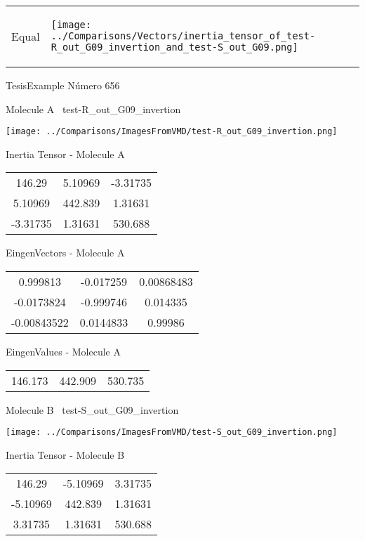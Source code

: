 \vtab[-5mm]
\begin{tabular}{*{2}{m{}}}
\begin{center}
\textcolor{NavyBlue}{\Large Equal}
\end{center}
&
\begin{center}
\texttt{[image: ../Comparisons/Vectors/inertia\_tensor\_of\_test-R\_out\_G09\_invertion\_and\_test-S\_out\_G09.png]}
\end{center}
\end{tabular}

 \newpage

\vtab[-3cm]
\begin{center}
{\large TesisExample \tab Número 656}
\end{center}
\begin{multicols}{2}
\begin{center}

Molecule A \
test-R\_out\_G09\_invertion

\texttt{[image: ../Comparisons/ImagesFromVMD/test-R\_out\_G09\_invertion.png]}

Inertia Tensor - Molecule A \\
\begin{tabular}{|c c c|}
146.29	 & 	5.10969	 & 	-3.31735	 \\
5.10969	 & 	442.839	 & 	1.31631	 \\
-3.31735	 & 	1.31631	 & 	530.688
\end{tabular}

\vtab
 EingenVectors - Molecule A     \\
\begin{tabular}{|c c c|}
0.999813	 & 	-0.017259	 & 	0.00868483	 \\
-0.0173824	 & 	-0.999746	 & 	0.014335	 \\
-0.00843522	 & 	0.0144833	 & 	0.99986
\end{tabular}

\vtab
 EingenValues - Molecule A     \\
\begin{tabular}{|c c c|}
146.173	 & 	442.909	 & 	530.735	 \\
\end{tabular}
\columnbreak

Molecule B \
test-S\_out\_G09\_invertion

\texttt{[image: ../Comparisons/ImagesFromVMD/test-S\_out\_G09\_invertion.png]}

Inertia Tensor - Molecule B \\
\begin{tabular}{|c c c|}
146.29	 & 	-5.10969	 & 	3.31735	 \\
-5.10969	 & 	442.839	 & 	1.31631	 \\
3.31735	 & 	1.31631	 & 	530.688
\end{tabular}


\end{center}
\end{multicols}
